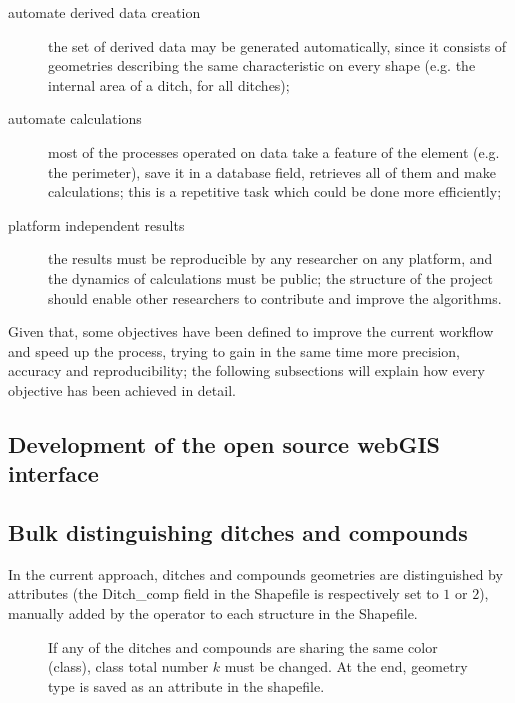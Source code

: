         \begin{description}
            \item[automate derived data creation] the set of derived data may be generated automatically, since it consists of geometries describing the same characteristic on every shape (e.g. the internal area of a ditch, for all ditches);
            \item[automate calculations] most of the processes operated on data take a feature of the element (e.g. the perimeter), save it in a database field, retrieves all of them and make calculations; this is a repetitive task which could be done more efficiently;
            \item[platform independent results] the results must be reproducible by any researcher on any platform, and the dynamics of calculations must be public; the structure of the project should enable other researchers to contribute and improve the algorithms.
        \end{description}

        Given that, some objectives have been defined to improve the current workflow and speed up the process, trying to gain in the same time more precision, accuracy and reproducibility; the following subsections will explain how every objective has been achieved in detail.

        \subsection{Development of the open source webGIS interface}

        \subsection{Bulk distinguishing ditches and compounds}
            In the current approach, ditches and compounds geometries are distinguished by attributes (the \textsf{Ditch\_comp} field in the Shapefile is respectively set to $1$ or $2$), manually added by the operator to each structure in the Shapefile.

            \begin{wrapfigure}{l}{0.5\textwidth}
                \centering
                \begin{tikzpicture}[x=1mm,y=1mm,scale=0.005]
                    
                \end{tikzpicture}
                \caption[Flow chart: the logic of bulk distinguishing ditches and compounds]{If any of the ditches and compounds are sharing the same color (class), class total number $k$ must be changed. At the end, geometry type is saved as an attribute in the shapefile.}
                \label{fig:flow-map}
            \end{wrapfigure}

